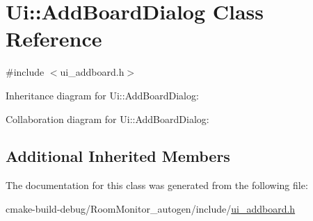 \hypertarget{class_ui_1_1_add_board_dialog}{}\section{Ui\+:\+:Add\+Board\+Dialog Class Reference}
\label{class_ui_1_1_add_board_dialog}


{\ttfamily \#include $<$ui\+\_\+addboard.\+h$>$}



Inheritance diagram for Ui\+:\+:Add\+Board\+Dialog\+:


Collaboration diagram for Ui\+:\+:Add\+Board\+Dialog\+:
\subsection*{Additional Inherited Members}


The documentation for this class was generated from the following file\+:\begin{DoxyCompactItemize}
\item 
cmake-\/build-\/debug/\+Room\+Monitor\+\_\+autogen/include/\hyperlink{ui__addboard_8h}{ui\+\_\+addboard.\+h}\end{DoxyCompactItemize}
